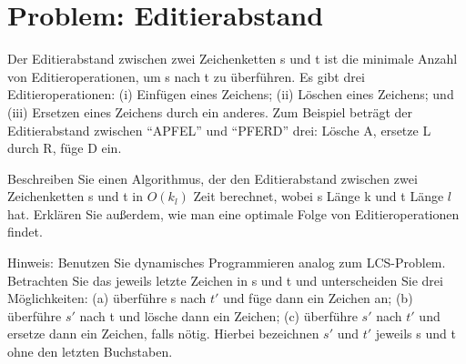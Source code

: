 \section{Problem: Editierabstand}


Der Editierabstand zwischen zwei Zeichenketten s und t ist die minimale Anzahl
von Editieroperationen, um s nach t zu überführen. Es gibt drei Editieroperationen: (i) Einfügen eines Zeichens; (ii) Löschen eines Zeichens; und (iii) Ersetzen eines Zeichens durch ein anderes. Zum Beispiel beträgt der Editierabstand zwischen “APFEL” und “PFERD” drei: Lösche A, ersetze L durch R, füge D ein.

Beschreiben Sie einen Algorithmus, der den Editierabstand zwischen zwei Zeichenketten s und t in $O(k_l)$ Zeit berechnet, wobei s Länge k und t Länge $l$ hat. Erklären Sie außerdem, wie man eine optimale Folge von Editieroperationen findet.

Hinweis: Benutzen Sie dynamisches Programmieren analog zum LCS-Problem. Betrachten Sie das jeweils letzte Zeichen in s und t und unterscheiden Sie drei Möglichkeiten: (a) überführe s nach $t'$ und füge dann ein Zeichen an; (b) überführe $s'$ nach t
und lösche dann ein Zeichen; (c) überführe $s'$ nach $t'$ und ersetze dann ein Zeichen, falls nötig. Hierbei bezeichnen $s'$ und $t'$ jeweils s und t ohne den letzten Buchstaben.